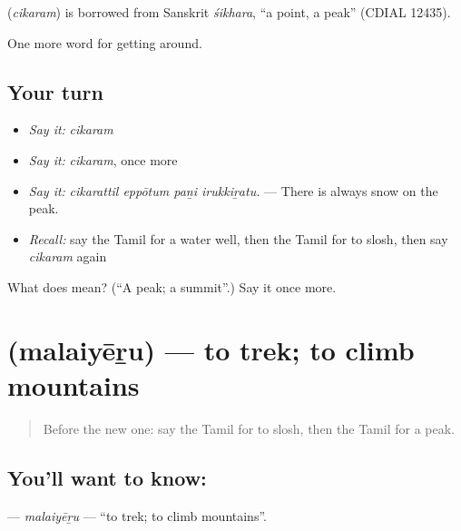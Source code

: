 \begin{cousinweb}
\textbf{} (\emph{cikaram}) is borrowed from Sanskrit \emph{śikhara}, \textquotedblleft{}a point, a peak\textquotedblright{} (CDIAL 12435).
\end{cousinweb}

\begin{grammarlens}[title={What you've built}]
One more word for getting around.
\end{grammarlens}

\subsection*{Your turn}
\begin{itemize}
\raggedright
  \item \emph{Say it:} \emph{cikaram}
  \item \emph{Say it:} \emph{cikaram}, once more
  \item \emph{Say it:} \emph{cikarattil eppōtum paṉi irukkiṟatu.} — There is always snow on the peak.
  \item \emph{Recall:} say the Tamil for a water well, then the Tamil for to slosh, then say \emph{cikaram} again
\end{itemize}

\begin{tcolorbox}[breakable,colback=teal!4,colframe=teal!35!black,title={Before you move on}]
What does  mean? (\textquotedblleft{}A peak; a summit\textquotedblright{}.) Say it once more.
\end{tcolorbox}
\section[\texorpdfstring{\ta{மலையேறு} (malaiyēṟu)}{மலையேறு (malaiyēṟu)}]{ (malaiyēṟu) — to trek; to climb mountains}

\label{lesson:TA-C433-malaiyeru}



\begin{quote}
Before the new one: say the Tamil for to slosh, then the Tamil for a peak.
\end{quote}

\subsection*{You'll want to know: }
\textbf{} — \emph{malaiyēṟu} — \textquotedblleft{}to trek; to climb mountains\textquotedblright{}.

